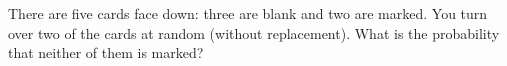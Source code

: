 There are five cards face down: three are blank and two are marked. You turn over two of the cards at random (without replacement). What is the probability that neither of them is marked?
